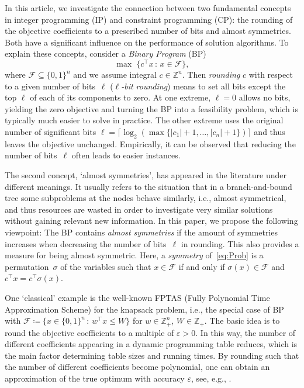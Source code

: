 \documentclass[runningheads]{llncs}
\newcommand{\ceil}[1]{\lceil #1 \rceil}
\newcommand{\abs}[1]{\lvert{#1}\rvert}
\newcommand{\Z}{\mathds{Z}}
\newcommand{\define}{\coloneqq}
\newcommand{\T}{^\top}
\newcommand{\suchthat}{\,:\,}
\newcommand{\F}{\mathcal{F}}
\begin{document}
In this article, we investigate the connection between two fundamental concepts in integer programming (IP) and constraint programming (CP): the rounding of the objective coefficients to a prescribed number of bits and almost symmetries.
Both have a significant influence on the performance of solution algorithms.
To explain these concepts, consider a \emph{Binary Program} (BP)
\begin{equation}\label{eq:Prob}
\max\; \{c\T x \suchthat x \in \F\},
\end{equation}
where $\F \subseteq \{0,1\}^n$ and we assume integral $c \in \Z^n$.
Then \emph{rounding} $c$ with respect to a given number of bits~$\ell$ (\emph{$\ell$-bit rounding}) means to set all bits except the top $\ell$ of each of its components to zero.
At one extreme, $\ell = 0$ allows no bits, 
yielding the zero objective and turning the BP into a feasibility problem, which is typically much easier to solve in practice.
The other extreme uses the original number of significant bits $\ell = \ceil{\log_2(\max\{\abs{c_1} + 1, \dots, \abs{c_n} + 1\})}$ and thus leaves the objective unchanged.
Empirically, it can be observed that reducing the number of bits~$\ell$ often leads to easier instances.

The second concept, `almost symmetries', has appeared in the literature under different meanings.
It usually refers to the situation that in a branch-and-bound tree some subproblems at the nodes behave similarly, i.e., almost symmetrical, and thus resources are wasted in order to investigate very similar solutions without gaining relevant new information. In this paper, we propose the following viewpoint: The BP contains \emph{almost symmetries} if the amount of symmetries increases when decreasing the number of bits~$\ell$ in rounding. This also provides a measure for being almost symmetric. Here, a \emph{symmetry} of~\eqref{eq:Prob} is a permutation~$\sigma$ of the variables such that $x \in \F$ if and only if $\sigma(x) \in \F$ and $c\T x = c\T \sigma(x)$.

One `classical' example is the well-known FPTAS (Fully Polynomial Time Approximation Scheme) for the knapsack problem, i.e., the special case of BP with $\F \define \{x \in \{0,1\}^n \suchthat w\T x \leq W\}$ for $w \in \Z_+^n$, $W \in \Z_+$. The basic idea is to round the objective coefficients to a multiple of $\varepsilon > 0$. In this way, the number of different coefficients appearing in a dynamic programming table reduces, which is the main factor determining table sizes and running times. By rounding such that the number of different coefficients become polynomial, one can obtain an approximation of the true optimum with accuracy $\varepsilon$, see, e.g., \cite[Chapter~17]{KorV18}.
\end{document}
